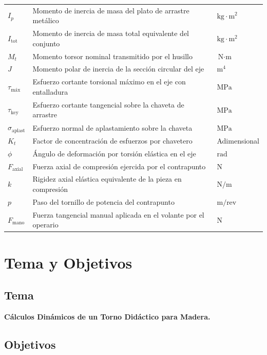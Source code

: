 \documentclass[12pt,a4paper]{article}
\begin{document}
\begin{center}
\begin{longtable}{p{1.8cm} p{10.2cm} >{\centering\arraybackslash}p{2.6cm}}
    $I_p$ & Momento de inercia de masa del plato de arrastre metálico & $\text{kg}\cdot\text{m}^2$ \\
    $I_{\text{tot}}$ & Momento de inercia de masa total equivalente del conjunto & $\text{kg}\cdot\text{m}^2$ \\
    $M_t$ & Momento torsor nominal transmitido por el husillo & $\text{N}\cdot\text{m}$ \\
    $J$ & Momento polar de inercia de la sección circular del eje & $\text{m}^4$ \\
    $\tau_{\text{máx}}$ & Esfuerzo cortante torsional máximo en el eje con entalladura & $\text{MPa}$ \\
    $\tau_{\text{key}}$ & Esfuerzo cortante tangencial sobre la chaveta de arrastre & $\text{MPa}$ \\
    $\sigma_{\text{aplast}}$ & Esfuerzo normal de aplastamiento sobre la chaveta & $\text{MPa}$ \\
    $K_t$ & Factor de concentración de esfuerzos por chavetero & Adimensional \\
    $\phi$ & Ángulo de deformación por torsión elástica en el eje & $\text{rad}$ \\
    $F_{\text{axial}}$ & Fuerza axial de compresión ejercida por el contrapunto & $\text{N}$ \\
    $k$ & Rigidez axial elástica equivalente de la pieza en compresión & $\text{N/m}$ \\
    $p$ & Paso del tornillo de potencia del contrapunto & $\text{m/rev}$ \\
    $F_{\text{mano}}$ & Fuerza tangencial manual aplicada en el volante por el operario & $\text{N}$ \\
\end{longtable}
\end{center}

\clearpage
\section{Tema y Objetivos}

\subsection{Tema}
\textbf{Cálculos Dinámicos de un Torno Didáctico para Madera.}

\subsection{Objetivos}
\end{document}
